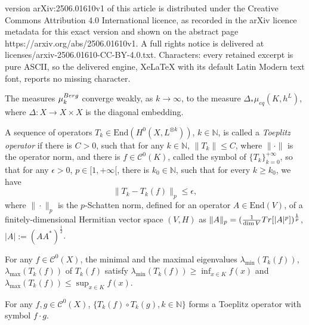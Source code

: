 \documentclass[10pt,a4paper]{amsart}
\newcommand{\ccal}{\mathscr{C}}
\newcommand{\enmr}[1]{\text{End}{(#1)}}
\newcommand{\nat}{\mathbb{N}}
\begin{document}
version arXiv:2506.01610v1 of this article is distributed under the Creative Commons Attribution 4.0 International licence, as recorded in the arXiv licence metadata for this exact version and shown on the abstract page https://arxiv.org/abs/2506.01610v1. A full rights notice is delivered at licenses/arxiv-2506.01610-CC-BY-4.0.txt. Characters: every retained excerpt is pure ASCII, so the delivered engine, XeLaTeX with its default Latin Modern text font, reports no missing character.
	\begin{thm}\label{thm_off_diag}
		The measures $\mu_k^{\rm{Berg}}$ converge weakly, as $k \to \infty$, to the measure $\Delta_* \mu_{eq}(K, h^L)$, where $\Delta: X \to X \times X$ is the diagonal embedding.
	\end{thm}

	\begin{defn}\label{defn_toepl_sch}
		A sequence of operators $T_k \in {\enmr{H^0(X, L^{\otimes k})}}$, $k \in \nat$, is called a \textit{Toeplitz operator} if there is $C > 0$, such that for any $k \in \nat$, $\| T_k \| \leq C$, where $\| \cdot \|$ is the operator norm, and there is $f \in \ccal^0(K)$, called the symbol of $\{T_k\}_{k = 0}^{+ \infty}$, so that for any $\epsilon > 0$, $p \in [1, +\infty[$, there is $k_0 \in \nat$, such that for every $k \geq k_0$, we have
		\begin{equation}\label{eq_toepl_schatten}
			\big \| T_k -  T_k(f) \big \|_p \leq \epsilon,
		\end{equation}
		where $\| \cdot \|_p$ is the $p$-Schatten norm, defined for an operator $A \in {\enmr{V}}$, of a finitely-dimensional Hermitian vector space $(V, H)$ as $\| A \|_p = (\frac{1}{\dim V} {\rm{Tr}}[|A|^p])^{\frac{1}{p}}$, $|A| := (A A^*)^{\frac{1}{2}}$.
	\end{defn}

	\begin{lem}\label{lem_spec_radius}
		For any $f \in \ccal^0(X)$, the minimal and the maximal eigenvalues $\lambda_{\min}(T_k(f))$, $\lambda_{\max}(T_k(f))$ of $T_k(f)$ satisfy $\lambda_{\min}(T_k(f)) \geq \inf_{x \in K} f(x)$ and $\lambda_{\max}(T_k(f)) \leq \sup_{x \in K} f(x)$.
	\end{lem}

	\begin{thm}\label{thm_prod_thm}
		For any $f, g \in \ccal^0(X)$, $\{ T_k(f) \circ T_k(g), k \in \nat \}$ forms a Toeplitz operator with symbol $f \cdot g$.
	\end{thm}
\end{document}
